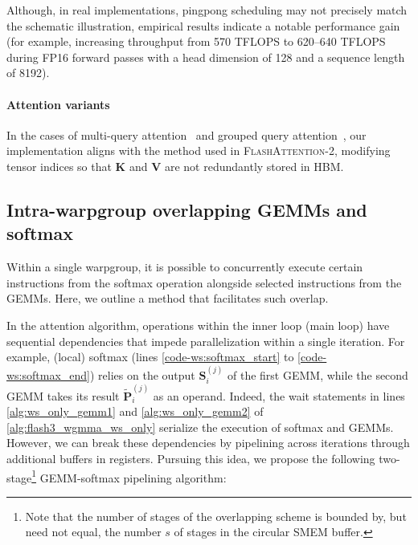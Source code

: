 Although, in real implementations, pingpong scheduling may not precisely match the schematic illustration, empirical results indicate a notable performance gain (for example, increasing throughput from 570 TFLOPS to 620–640 TFLOPS during FP16 forward passes with a head dimension of 128 and a sequence length of 8192).

\paragraph{Attention variants} In the cases of multi-query attention~\citep{shazeer2019fast} and grouped query attention~\citep{ainslie2023gqa}, our implementation aligns with the method used in \textsc{FlashAttention-2}, modifying tensor indices so that $\mathbf{K}$ and $\mathbf{V}$ are not redundantly stored in HBM.

\subsection{Intra-warpgroup overlapping GEMMs and softmax}

Within a single warpgroup, it is possible to concurrently execute certain instructions from the softmax operation alongside selected instructions from the GEMMs. Here, we outline a method that facilitates such overlap.

In the attention algorithm, operations within the inner loop (main loop) have sequential dependencies that impede parallelization within a single iteration. For example, (local) softmax (lines \ref{code-ws:softmax_start} to \ref{code-ws:softmax_end}) relies on the output $\mathbf{S}_i^{(j)}$ of the first GEMM, while the second GEMM takes its result $\widetilde{\mathbf{P}}_i^{(j)}$ as an operand. Indeed, the wait statements in lines \ref{alg:ws_only_gemm1} and \ref{alg:ws_only_gemm2} of \cref{alg:flash3_wgmma_ws_only} serialize the execution of softmax and GEMMs. However, we can break these dependencies by pipelining across iterations through additional buffers in registers. Pursuing this idea, we propose the following two-stage\footnote{Note that the number of stages of the overlapping scheme is bounded by, but need not equal, the number $s$ of stages in the circular SMEM buffer.} GEMM-softmax pipelining algorithm:

